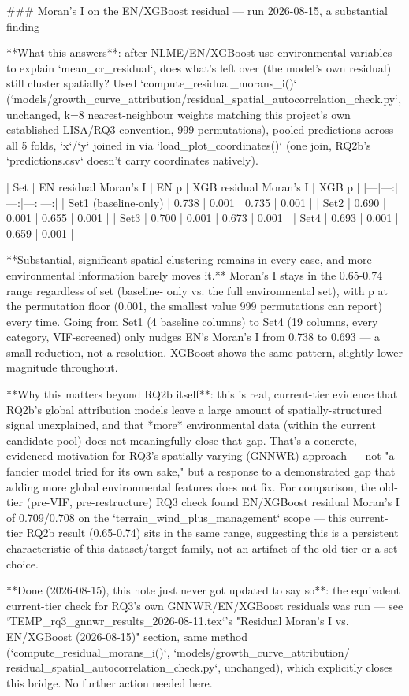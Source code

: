 ### Moran's I on the EN/XGBoost residual — run 2026-08-15, a substantial finding

**What this answers**: after NLME/EN/XGBoost use environmental variables to explain
`mean_cr_residual`, does what's left over (the model's own residual) still cluster spatially? Used
`compute_residual_morans_i()` (`models/growth_curve_attribution/residual_spatial_autocorrelation_check.py`,
unchanged, k=8 nearest-neighbour weights matching this project's own established LISA/RQ3
convention, 999 permutations), pooled predictions across all 5 folds, `x`/`y` joined in via
`load_plot_coordinates()` (one join, RQ2b's `predictions.csv` doesn't carry coordinates natively).

| Set | EN residual Moran's I | EN p | XGB residual Moran's I | XGB p |
|---|---:|---:|---:|---:|
| Set1 (baseline-only) | 0.738 | 0.001 | 0.735 | 0.001 |
| Set2 | 0.690 | 0.001 | 0.655 | 0.001 |
| Set3 | 0.700 | 0.001 | 0.673 | 0.001 |
| Set4 | 0.693 | 0.001 | 0.659 | 0.001 |

**Substantial, significant spatial clustering remains in every case, and more environmental
information barely moves it.** Moran's I stays in the 0.65-0.74 range regardless of set (baseline-
only vs. the full environmental set), with p at the permutation floor (0.001, the smallest value
999 permutations can report) every time. Going from Set1 (4 baseline columns) to Set4 (19 columns,
every category, VIF-screened) only nudges EN's Moran's I from 0.738 to 0.693 — a small reduction,
not a resolution. XGBoost shows the same pattern, slightly lower magnitude throughout.

**Why this matters beyond RQ2b itself**: this is real, current-tier evidence that RQ2b's global
attribution models leave a large amount of spatially-structured signal unexplained, and that
*more* environmental data (within the current candidate pool) does not meaningfully close that
gap. That's a concrete, evidenced motivation for RQ3's spatially-varying (GNNWR) approach — not
"a fancier model tried for its own sake," but a response to a demonstrated gap that adding more
global environmental features does not fix. For comparison, the old-tier (pre-VIF, pre-restructure)
RQ3 check found EN/XGBoost residual Moran's I of 0.709/0.708 on the `terrain_wind_plus_management`
scope — this current-tier RQ2b result (0.65-0.74) sits in the same range, suggesting this is a
persistent characteristic of this dataset/target family, not an artifact of the old tier or a set
choice.

**Done (2026-08-15), this note just never got updated to say so**: the equivalent current-tier
check for RQ3's own GNNWR/EN/XGBoost residuals was run — see
`TEMP_rq3_gnnwr_results_2026-08-11.tex`'s "Residual Moran's I vs. EN/XGBoost (2026-08-15)" section,
same method (`compute_residual_morans_i()`, `models/growth_curve_attribution/
residual_spatial_autocorrelation_check.py`, unchanged), which explicitly closes this bridge. No
further action needed here.

